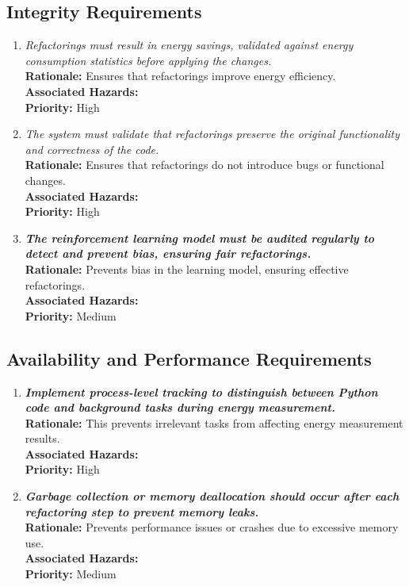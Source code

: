 \documentclass{article}
\begin{document}
\subsection{Integrity Requirements}
\begin{enumerate}[label=SR-IN \arabic*., wide=0pt, leftmargin=*]
    \item \emph{Refactorings must result in energy savings, validated against energy consumption statistics before applying the changes.}\\[2mm]
    {\bf Rationale:} Ensures that refactorings improve energy efficiency.\\
    {\bf Associated Hazards:} \\
    {\bf Priority:} High
    \item \emph{The system must validate that refactorings preserve the original functionality and correctness of the code.}\\[2mm]
    {\bf Rationale:} Ensures that refactorings do not introduce bugs or functional changes.\\
    {\bf Associated Hazards:} \\
    {\bf Priority:} High
    \item \emph{\textbf{The reinforcement learning model must be audited regularly to detect and prevent bias, ensuring fair refactorings.}}\\[2mm]
    {\bf Rationale:} Prevents bias in the learning model, ensuring effective refactorings.\\
    {\bf Associated Hazards:} \\
    {\bf Priority:} Medium
\end{enumerate}

\subsection{Availability and Performance Requirements}
\begin{enumerate}[label=SR-AV \arabic*., wide=0pt, leftmargin=*]
    \item \emph{\textbf{Implement process-level tracking to distinguish between Python code and background tasks during energy measurement.}}\\[2mm]
    {\bf Rationale:} This prevents irrelevant tasks from affecting energy measurement results.\\
    {\bf Associated Hazards:} \\
    {\bf Priority:} High
    \item \emph{\textbf{Garbage collection or memory deallocation should occur after each refactoring step to prevent memory leaks.}}\\[2mm]
    {\bf Rationale:} Prevents performance issues or crashes due to excessive memory use.\\
    {\bf Associated Hazards:} \\
    {\bf Priority:} Medium
\end{enumerate}
\end{document}
